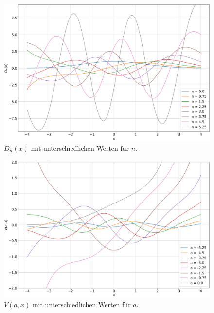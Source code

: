\begin{figure}
    \centering
    \includegraphics[scale=0.35]{papers/parzyl/img/D_plot.png}
    \caption{$D_n(x)$ mit unterschiedlichen Werten für $n$.}
    \label{parzyl:fig:dnz}
\end{figure}
\begin{figure}
    \centering
    \includegraphics[scale=0.35]{papers/parzyl/img/v_plot.png}
    \caption{$V(a,x)$ mit unterschiedlichen Werten für $a$.}
    \label{parzyl:fig:Vnz}
\end{figure}
